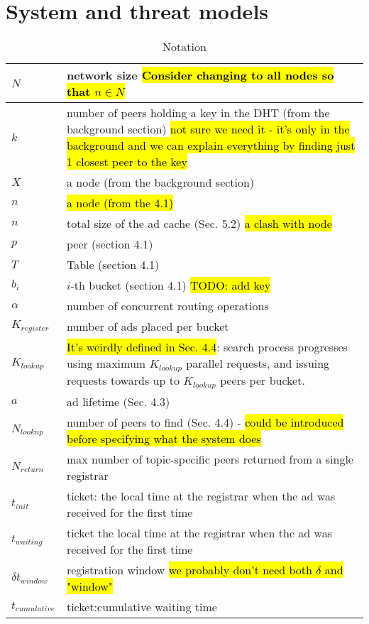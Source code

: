 
\section{System and threat models}
\label{sec:model}

\begin{table}
    \caption{Notation}
    \label{tab:notation}
\begin{center}
    \begin{tabular}{ | l | p{8cm} |}
      \hline
        $N$ & network size \hl{Consider changing to all nodes so that $n \in N$} \\ \hline
        $k$ & number of peers holding a key in the DHT (from the background section) \hl{not sure we need it - it's only in the background and we can explain everything by finding just 1 closest peer to the key} \\ \hline
        $X$ & a node (from the background section) \\ \hline
        $n$ & \hl{a node (from the 4.1)} \\ \hline
        $n$ & total size of the ad cache (Sec. 5.2) \hl{a clash with node} \\ \hline
        $p$ & peer (section 4.1) \\ \hline
        $T$ & Table (section 4.1) \\ \hline
        $b_i$& $i$-th bucket (section 4.1) \hl{TODO: add key} \\ \hline
        $\alpha$ & number of concurrent routing operations \\ \hline
        $K_{\textit{register}}$ & number of ads placed per bucket\\ \hline
        $K_{\textit{lookup}}$ & \hl{It's weirdly defined in Sec. 4.4}: search process progresses using maximum $K_{\textit{lookup}}$  parallel requests, and issuing requests towards up to $K_{\textit{lookup}}$  peers per bucket.\\ \hline
        $a$ & ad lifetime  (Sec. 4.3)\\ \hline
        $N_{\textit{lookup}}$ & number of peers to find (Sec. 4.4) - \hl{could be introduced before specifying what the system does} \\ \hline
        $N_{\textit{return}}$ & max number of topic-specific peers returned from a single registrar \\ \hline
        $t_{\textit{init}}$ & ticket: the local time at the registrar when the ad was received for the first time \\ \hline
        $t_{\textit{waiting}}$ & ticket the local time at the registrar when the ad was received for the first time \\ \hline
        $\delta t_{\textit{window}}$ & registration window \hl{we probably don't need both $\delta$ and "window"} \\ \hline
        $t_{\textit{cumulative}}$ & ticket:cumulative waiting time \\ \hline
      \hline
    \end{tabular}
  \end{center}
\end{table}

